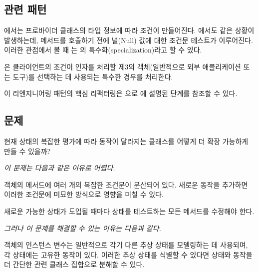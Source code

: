 \documentclass[a4paper,10pt,twoside]{book}
\begin{document}
\subsection*{관련 패턴}

에서는 프로바이더 클래스의 타입 정보에 따라 조건이 만들어진다. 에서도 같은 상황이 발생하는데, 메서드를 호출하기 전에 널(Null) 값에 대한 조건문 테스트가 이루어진다. 이러한 관점에서 볼 때 는 의 특수화(specialization)라고 할 수 있다. 

은 클라이언트의 조건이 인자를 처리할 제3의 객체(일반적으로 외부 애플리케이션 또는 도구)를 선택하는 데 사용되는 특수한 경우를 처리한다.

이 리엔지니어링 패턴의 핵심 리팩터링은 으로 \cite{Fowl99a}에 설명된 단계를 참조할 수 있다.



\subsection*{문제}

현재 상태의 복잡한 평가에 따라 동작이 달라지는 클래스를 어떻게 더 확장 가능하게 만들 수 있을까?

\emph{이 문제는 다음과 같은 이유로 어렵다.}

\begin{bulletlist}
\item 객체의 메서드에 여러 개의 복잡한 조건문이 분산되어 있다. 새로운 동작을 추가하면 이러한 조건문에 미묘한 방식으로 영향을 미칠 수 있다.

\item 새로운 가능한 상태가 도입될 때마다 상태를 테스트하는 모든 메서드를 수정해야 한다.
\end{bulletlist}

\emph{그러나 이 문제를 해결할 수 있는 이유는 다음과 같다.}

\begin{bulletlist}
\item 객체의 인스턴스 변수는 일반적으로 각기 다른 추상 상태를 모델링하는 데 사용되며, 각 상태에는 고유한 동작이 있다. 이러한 추상 상태를 식별할 수 있다면 상태와 동작을 더 간단한 관련 클래스 집합으로 분해할 수 있다.
\end{bulletlist}
\end{document}
